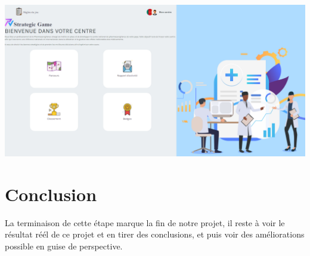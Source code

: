 \begin{center}
\includegraphics[scale=0.15]{images/6} 
\end{center}



\section{Conclusion}
La terminaison de cette étape marque la fin de notre projet, il reste à voir le résultat réél de ce projet et en tirer des conclusions, et puis voir des améliorations possible en guise de perspective.

